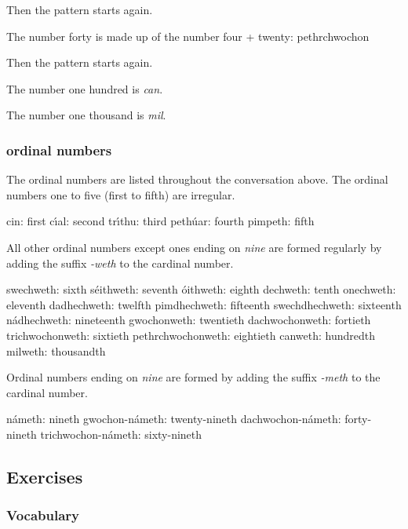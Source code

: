 Then the pattern starts again.

The number forty is made up of the number four + twenty: pethrchwochon

Then the pattern starts again.

The number one hundred is \textit{can}.

The number one thousand is \textit{mil}.

\subsubsection{ordinal numbers}

The ordinal numbers are listed throughout the conversation above. The ordinal numbers one to five (first to fifth) are irregular.

cin: first
c\'{\i}al: second
tr\'{\i}thu: third
peth\'{u}ar: fourth
pimpeth: fifth

All other ordinal numbers except ones ending on \textit{nine} are formed regularly by adding the suffix \textit{-weth} to the cardinal number.

swechweth: sixth
s\'{e}ithweth: seventh
\'{o}ithweth: eighth
dechweth: tenth
onechweth: eleventh
dadhechweth: twelfth
pimdhechweth: fifteenth
swechdhechweth: sixteenth
n\'{a}dhechweth: nineteenth
gwochonweth: twentieth
dachwochonweth: fortieth
trichwochonweth: sixtieth
pethrchwochonweth: eightieth
canweth: hundredth
milweth: thousandth

Ordinal numbers ending on \textit{nine} are formed by adding the suffix \textit{-meth} to the cardinal number.

n\'{a}meth: nineth
gwochon-n\'{a}meth: twenty-nineth
dachwochon-n\'{a}meth: forty-nineth
trichwochon-n\'{a}meth: sixty-nineth

\subsection{Exercises}

\subsubsection{Vocabulary}

